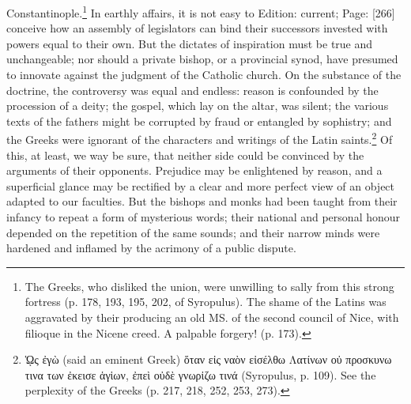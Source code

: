 Constantinople.\footnote{The Greeks, who disliked the union, were unwilling to sally from this strong fortress (p. 178, 193, 195, 202, of Syropulus). The shame of the Latins was aggravated by their producing an old MS. of the second council of Nice, with filioque in the Nicene creed. A palpable forgery! (p. 173).} In earthly affairs, it is not easy to Edition: current; Page: [266] conceive how an assembly of legislators can bind their successors invested with powers equal to their own. But the dictates of inspiration must be true and unchangeable; nor should a private bishop, or a provincial synod, have presumed to innovate against the judgment of the Catholic church. On the substance of the doctrine, the controversy was equal and endless: reason is confounded by the procession of a deity; the gospel, which lay on the altar, was silent; the various texts of the fathers might be corrupted by fraud or entangled by sophistry; and the Greeks were ignorant of the characters and writings of the Latin saints.\footnote{\textgreek{\texthebrew{ᾩ}ς \texthebrew{ἐ}γ\texthebrew{ὼ}} (said an eminent Greek) \textgreek{\texthebrew{ὅ}ταν ε\texthebrew{ἰ}ς να\texthebrew{ὸ}ν ε\texthebrew{ἰ}σέλθω Λατίνων ο\texthebrew{ὐ} προσκυνω τινα των \texthebrew{ἐ}κεισε \texthebrew{ἁ}γ\texthebrew{ἱ}ων, \texthebrew{ἐ}πε\texthebrew{ὶ} ο\texthebrew{ὐ}δ\texthebrew{ὲ} γνωρ\texthebrew{ἰ}ζω τινά} (Syropulus, p. 109). See the perplexity of the Greeks (p. 217, 218, 252, 253, 273).} Of this, at least, we way be sure, that neither side could be convinced by the arguments of their opponents. Prejudice may be enlightened by reason, and a superficial glance may be rectified by a clear and more perfect view of an object adapted to our faculties. But the bishops and monks had been taught from their infancy to repeat a form of mysterious words; their national and personal honour depended on the repetition of the same sounds; and their narrow minds were hardened and inflamed by the acrimony of a public dispute.

